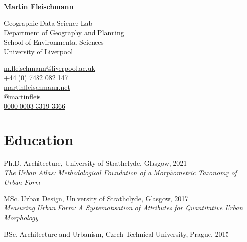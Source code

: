 \documentclass[12pt,a4paper]{report}
\newcommand{\myname}{Martin Fleischmann}
\newcommand{\namefont}[1]{{\normalfont\bfseries\Huge{#1}}}
\begin{document}
    \raggedright{}

    \namefont{\myname}

    \vspace{1em}

    \begin{minipage}[t]{0.5\textwidth}
        \begin{flushleft}
            Geographic Data Science Lab \\
            Department of Geography and Planning \\
            School of Environmental Sciences \\
            University of Liverpool
        \end{flushleft}
    \end{minipage}%
    \begin{minipage}[t]{0.5\textwidth}
        \begin{flushright}
            \href{mailto:m.fleischmann@liverpool.ac.uk}{m.fleischmann@liverpool.ac.uk} \\
            +44 (0) 7482 082 147 \\
            \href{https://martinfleischmann.net}{martinfleischmann.net} \\
            \href{https://twitter.com/martinfleis}{@martinfleis} \\
            \href{https://orcid.org/0000-0003-3319-3366}{0000-0003-3319-3366}
        \end{flushright}
    \end{minipage}%


    \section*{Education}

    \begin{tablist}

        \item[Ph.D.] \tab{}Architecture, University of Strathclyde, Glasgow, 2021 \\
                           \textit{The Urban Atlas: Methodological Foundation of a Morphometric Taxonomy of Urban Form}
        \item[MSc.]  \tab{}Urban Design, University of Strathclyde, Glasgow, 2017 \\
                           \textit{Measuring Urban Form: A Systematisation of Attributes for Quantitative Urban Morphology}
        \item[BSc.]  \tab{}Architecture and Urbanism, Czech Technical University, Prague, 2015

    \end{tablist}
\end{document}
